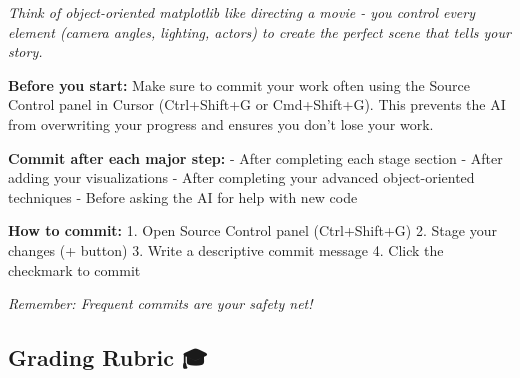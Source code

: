\documentclass[
  letterpaper,
  DIV=11,
  numbers=noendperiod]{scrartcl}
\begin{document}
\begin{tcolorbox}[enhanced jigsaw, rightrule=.15mm, coltitle=black, colbacktitle=quarto-callout-note-color!10!white, opacitybacktitle=0.6, arc=.35mm, leftrule=.75mm, colback=white, title=\textcolor{quarto-callout-note-color}{\faInfo}\hspace{0.5em}{🎯 Object-Oriented Matplotlib Philosophy}, colframe=quarto-callout-note-color-frame, bottomrule=.15mm, left=2mm, opacityback=0, toptitle=1mm, titlerule=0mm, toprule=.15mm, bottomtitle=1mm, breakable]

\emph{Think of object-oriented matplotlib like directing a movie - you
control every element (camera angles, lighting, actors) to create the
perfect scene that tells your story.}

\end{tcolorbox}

\begin{tcolorbox}[enhanced jigsaw, rightrule=.15mm, coltitle=black, colbacktitle=quarto-callout-warning-color!10!white, opacitybacktitle=0.6, arc=.35mm, leftrule=.75mm, colback=white, title=\textcolor{quarto-callout-warning-color}{\faExclamationTriangle}\hspace{0.5em}{💾 Important: Save Your Work Frequently!}, colframe=quarto-callout-warning-color-frame, bottomrule=.15mm, left=2mm, opacityback=0, toptitle=1mm, titlerule=0mm, toprule=.15mm, bottomtitle=1mm, breakable]

\textbf{Before you start:} Make sure to commit your work often using the
Source Control panel in Cursor (Ctrl+Shift+G or Cmd+Shift+G). This
prevents the AI from overwriting your progress and ensures you don't
lose your work.

\textbf{Commit after each major step:} - After completing each stage
section - After adding your visualizations - After completing your
advanced object-oriented techniques - Before asking the AI for help with
new code

\textbf{How to commit:} 1. Open Source Control panel (Ctrl+Shift+G) 2.
Stage your changes (+ button) 3. Write a descriptive commit message 4.
Click the checkmark to commit

\emph{Remember: Frequent commits are your safety net!}

\end{tcolorbox}

\subsection{Grading Rubric 🎓}\label{grading-rubric}
\end{document}
